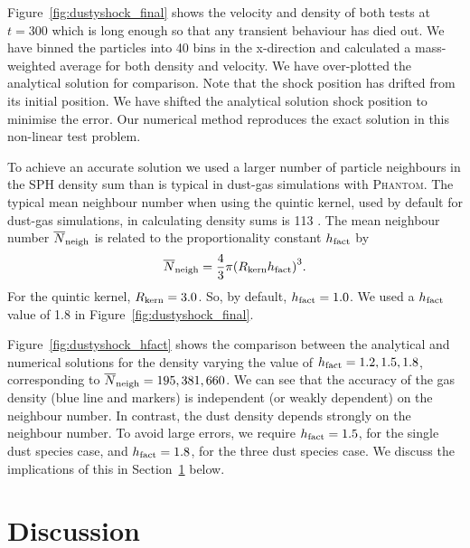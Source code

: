 \documentclass[fleqn,usenatbib]{mnras}
\begin{document}
Figure~\ref{fig:dustyshock_final} shows the velocity and density of both tests
at \(t = 300\) which is long enough so that any transient behaviour has died
out. We have binned the particles into 40 bins in the x-direction and calculated
a mass-weighted average for both density and velocity. We have over-plotted the
analytical solution for comparison. Note that the shock position has drifted
from its initial position. We have shifted the analytical solution shock
position to minimise the error. Our numerical method reproduces the exact
solution in this non-linear test problem.

To achieve an accurate solution we used a larger number of particle neighbours
in the SPH density sum than is typical in dust-gas simulations with
\textsc{Phantom}. The typical mean neighbour number when using the quintic
kernel, used by default for dust-gas simulations, in calculating density sums is
113 \citep{Price2018PASA...35...31P}. The mean neighbour number
\(\overline{N}_{\rm neigh}\) is related to the proportionality constant \(h_{\rm
fact}\) by
%
\begin{align}
   \overline{N}_{\rm neigh} = \frac{4}{3} \pi
      {\left( R_{\rm kern} h_{\rm fact} \right)}^3.
\end{align}
%
For the quintic kernel, \( R_{\rm kern} = 3.0 \). So, by default, \( h_{\rm
fact} = 1.0 \). We used a \(h_{\rm fact}\) value of 1.8 in
Figure~\ref{fig:dustyshock_final}.

Figure~\ref{fig:dustyshock_hfact} shows the comparison between the analytical
and numerical solutions for the density varying the value of \( h_{\rm fact} =
1.2, 1.5, 1.8 \), corresponding to \(\overline{N}_{\rm neigh} = 195, 381, 660\).
We can see that the accuracy of the gas density (blue line and markers) is
independent (or weakly dependent) on the neighbour number. In contrast, the dust
density depends strongly on the neighbour number. To avoid large errors, we
require \( h_{\rm fact} = 1.5\), for the single dust species case, and \(h_{\rm
fact} = 1.8\), for the three dust species case. We discuss the implications of
this in Section~\ref{sec:discussion} below.


\section{Discussion}%
\label{sec:discussion}
\end{document}
